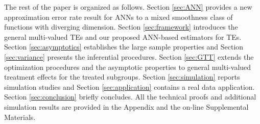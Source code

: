 \documentclass[11pt]{article}
\numberwithin{equation}{section}
\begin{document}




The rest of the paper is organized as follows. Section \ref{sec:ANN} provides a new approximation error rate result for ANNs to a mixed smoothness class of functions with diverging dimension. Section \ref{sec:framework} introduces the general multi-valued TEs and our proposed ANN-based estimators for TEs. Section \ref{sec:asymptotics} establishes the large sample properties and Section \ref{sec:variance} presents the inferential procedures. Section \ref{sec:GTT} extends the optimization procedures and the asymptotic properties to general multi-valued treatment effects for the treated subgroups. Section \ref{sec:simulation} reports simulation studies and
Section \ref{sec:application} contains a real data application. Section \ref{sec:conclusion} briefly concludes. All the technical proofs and additional simulation results are provided in the Appendix and the on-line
Supplemental Materials.
\end{document}
